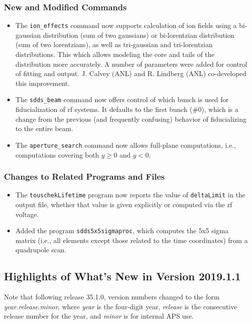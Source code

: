 \documentclass[11pt]{article}
\begin{document}
\subsubsection{New and Modified Commands}
\begin{itemize}
\item The \verb|ion_effects| command now supports calculation of ion fields using a bi-gaussian distribution (sum of two
  gaussians) or bi-lorentzian distribution (sum of two lorentzians), as well as tri-gaussian and tri-lorentzian
  distributions. This which allows modeling the core and tails of the distribution more accurately. A number of parameters
  were added for control of fitting and output. J. Calvey (ANL) and R. Lindberg (ANL) co-developed this improvement.
\item The \verb|sdds_beam| command now offers control of which bunch is used for fiducialization of rf systems.
  It defaults to the first bunch (\#0), which is a change from the previous (and frequently confusing) behavior
  of fiducializing to the entire beam.
\item The \verb|aperture_search| command now allows full-plane computations, i.e., computations covering both $y\geq 0$ and
  $y<0$.
\end{itemize}

\subsubsection{Changes to Related Programs and Files}

\begin{itemize}
\item The \verb|touschekLifetime| program now reports the value of \verb|deltaLimit| in the output file, whether that
  value is given explicitly or computed via the rf voltage.
\item Added the program \verb|sdds5x5sigmaproc|, which computes the 5x5 sigma matrix (i.e., all elements except those
  related to the time coordinates) from a quadrupole scan.
\end{itemize}


\subsection{Highlights of What's New in Version 2019.1.1}

Note that following release 35.1.0, version numbers changed to the form {\em year}.{\em release}.{\em minor},
where {\em year} is the four-digit year, {\em release} is the consecutive release number for the year,
and {\em minor} is for internal APS use.
\end{document}

